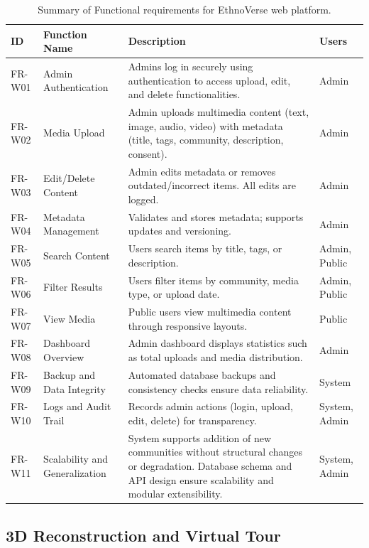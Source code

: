 \begin{table}[H]
\centering
\small
\begin{tabular}{p{1.5cm} p{3cm} p{8cm} p{2cm}}
\hline
\textbf{ID} & \textbf{Function Name} & \textbf{Description} & \textbf{Users} \\
\hline
FR-W01 & Admin Authentication & Admins log in securely using authentication to access upload, edit, and delete functionalities. & Admin \\
FR-W02 & Media Upload & Admin uploads multimedia content (text, image, audio, video) with metadata (title, tags, community, description, consent). & Admin \\
FR-W03 & Edit/Delete Content & Admin edits metadata or removes outdated/incorrect items. All edits are logged. & Admin \\
FR-W04 & Metadata Management & Validates and stores metadata; supports updates and versioning. & Admin \\
FR-W05 & Search Content & Users search items by title, tags, or description. & Admin, Public \\
FR-W06 & Filter Results & Users filter items by community, media type, or upload date. & Admin, Public \\
FR-W07 & View Media & Public users view multimedia content through responsive layouts. & Public \\
FR-W08 & Dashboard Overview & Admin dashboard displays statistics such as total uploads and media distribution. & Admin \\
FR-W09 & Backup and Data Integrity & Automated database backups and consistency checks ensure data reliability. & System \\
FR-W10 & Logs and Audit Trail & Records admin actions (login, upload, edit, delete) for transparency. & System, Admin \\
FR-W11 & Scalability and Generalization & System supports addition of new communities without structural changes or degradation. Database schema and API design ensure scalability and modular extensibility. & System, Admin \\

\hline
\end{tabular}
\caption{Summary of Functional requirements for EthnoVerse web platform.}
\end{table}

\subsection{3D Reconstruction and Virtual Tour}

